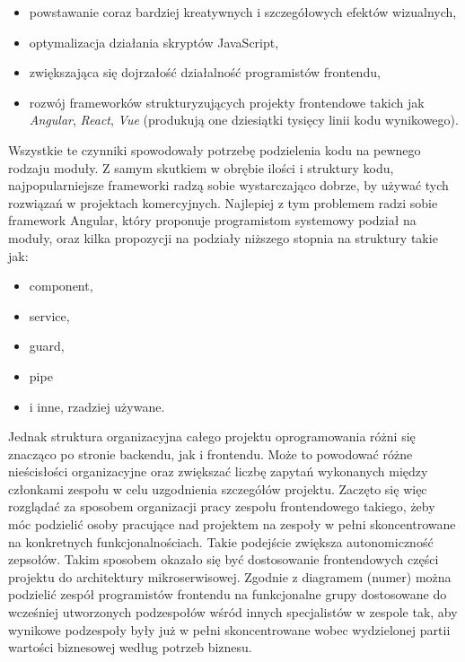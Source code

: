 \documentclass{SGGW-thesis}
\begin{document}
  \begin{itemize}
    \item powstawanie coraz bardziej kreatywnych i szczegółowych efektów wizualnych,
    \item optymalizacja działania skryptów JavaScript,
    \item zwiększająca się dojrzałość działalność programistów frontendu,
    \item rozwój frameworków strukturyzujących projekty frontendowe takich jak \textit{Angular}, \textit{React}, \textit{Vue} (produkują one dziesiątki tysięcy linii kodu wynikowego).
  \end{itemize}

  Wszystkie te czynniki spowodowały potrzebę podzielenia kodu na pewnego rodzaju moduły. Z samym skutkiem w obrębie ilości i struktury kodu, najpopularniejsze frameworki radzą sobie wystarczająco dobrze, by używać tych rozwiązań w projektach komercyjnych. Najlepiej z tym problemem radzi sobie framework Angular, który proponuje programistom systemowy podział na moduły, oraz kilka propozycji na podziały niższego stopnia na struktury takie jak:
  
  \begin{itemize}
    \item component,
    \item service,
    \item guard,
    \item pipe
    \item i inne, rzadziej używane.
  \end{itemize}

  Jednak struktura organizacyjna całego projektu oprogramowania różni się znacząco po stronie backendu, jak i frontendu. Może to powodować różne nieścisłości organizacyjne oraz zwiększać liczbę zapytań wykonanych między członkami zespołu w celu uzgodnienia szczegółów projektu. Zaczęto się więc rozglądać za sposobem organizacji pracy zespołu frontendowego takiego, żeby móc podzielić osoby pracujące nad projektem na zespoły w pełni skoncentrowane na konkretnych funkcjonalnościach. Takie podejście zwiększa autonomiczność zepsołów.
  Takim sposobem okazało się być dostosowanie frontendowych części projektu do architektury mikroserwisowej. Zgodnie z diagramem (numer) można podzielić zespół programistów frontendu na funkcjonalne grupy dostosowane do wcześniej utworzonych podzespołów wśród innych specjalistów w zespole tak, aby wynikowe podzespoły były już w pełni skoncentrowane wobec wydzielonej partii wartości biznesowej według potrzeb biznesu. 
  
\end{document}
